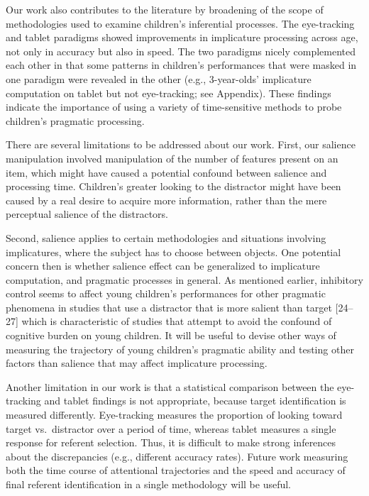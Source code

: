 \documentclass{rsos}
\begin{document}
Our work also contributes to the literature by broadening of the scope
of methodologies used to examine children's inferential processes. The
eye-tracking and tablet paradigms showed improvements in implicature
processing across age, not only in accuracy but also in speed. The two
paradigms nicely complemented each other in that some patterns in
children's performances that were masked in one paradigm were revealed
in the other (e.g., 3-year-olds' implicature computation on tablet but
not eye-tracking; see Appendix). These findings indicate the importance
of using a variety of time-sensitive methods to probe children's
pragmatic processing.

There are several limitations to be addressed about our work. First, our
salience manipulation involved manipulation of the number of features
present on an item, which might have caused a potential confound between
salience and processing time. Children's greater looking to the
distractor might have been caused by a real desire to acquire more
information, rather than the mere perceptual salience of the
distractors. 

Second, salience applies to certain methodologies and situations involving implicatures, 
where the subject has to choose between objects. One potential concern then is whether salience effect can be generalized to implicature computation, and pragmatic processes in general.
As mentioned earlier, inhibitory control seems to affect young children's performances for 
other pragmatic phenomena in studies that use a distractor that is more salient than target 
{[}24--27{]} which is characteristic of studies that attempt to avoid the confound of cognitive burden on young children. It will be useful to devise other ways of measuring the trajectory of young children's pragmatic ability and testing other factors than salience that may affect implicature processing.

Another limitation in our work is that a statistical comparison between the eye-tracking
and tablet findings is not appropriate, because target identification is
measured differently. Eye-tracking measures the proportion of looking
toward target vs.~distractor over a period of time, whereas tablet
measures a single response for referent selection. Thus, it is difficult
to make strong inferences about the discrepancies (e.g., different
accuracy rates). Future work measuring both the time course of
attentional trajectories and the speed and accuracy of final referent
identification in a single methodology will be useful.
\end{document}
